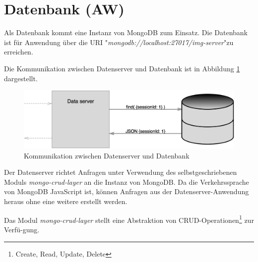 \section{Datenbank (AW)}
\label{section_datenbank}
Als Datenbank kommt eine Instanz von MongoDB zum Einsatz.
Die Datenbank ist für Anwendung über die URI "\textit{mongodb://localhost:27017/img-server}"{}zu erreichen.

Die Kommunikation zwischen Datenserver und Datenbank ist in Abbildung 
\ref{fig_kommunikation_datenbank} dargestellt.
\begin{figure}[h]
	\centering
	\includegraphics[width=14cm]{bilder/abbildung_datenbank}
	\caption{Kommunikation zwischen Datenserver und Datenbank}
	\label{fig_kommunikation_datenbank}
\end{figure}

Der Datenserver richtet Anfragen unter Verwendung des selbstgeschriebenen Moduls 
\textit{mongo-crud-layer} an die Instanz von MongoDB. Da die Verkehrssprache von 
MongoDB JavaScript ist, können Anfragen aus der Datenserver-Anwendung heraus ohne 
eine weitere erstellt werden.

Das Modul \textit{mongo-crud-layer} stellt eine Abstraktion von CRUD-Operationen\footnote{Create, Read, Update, Delete} zur Verfü-gung.